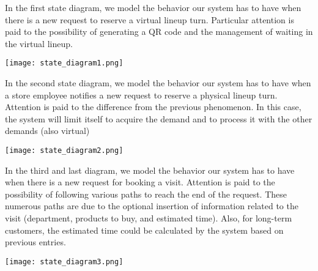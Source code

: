In the first state diagram, we model the behavior our system has to have when there is a new request to reserve a virtual lineup turn. Particular attention is paid to the possibility of generating a QR code and the management of waiting in the virtual lineup. \newline


\texttt{[image: state\_diagram1.png]} \newline


In the second state diagram, we model the behavior our system has to have when a store employee notifies a new request to reserve a physical lineup turn. Attention is paid to the difference from the previous phenomenon. In this case, the system will limit itself to acquire the demand and to process it with the other demands (also virtual) \newline


\texttt{[image: state\_diagram2.png]} \newline


In the third and last diagram, we model the behavior our system has to have when there is a new request for booking a visit. Attention is paid to the possibility of following various paths to reach the end of the request. These numerous paths are due to the optional insertion of information related to the visit (department, products to buy, and estimated time). Also, for long-term customers, the estimated time could be calculated by the system based on previous entries. \newline 

\texttt{[image: state\_diagram3.png]} \newline